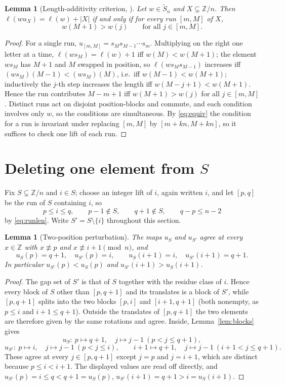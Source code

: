 \documentclass[11pt]{article}
\newtheorem{lem}[thm]{Lemma}
\theoremstyle{definition}
\newcommand{\Z}{\mathbb{Z}}
\newcommand{\Saff}{\widetilde{S}_{n}}
\begin{document}
\begin{lem}[Length-additivity criterion, {\cite[Lem.~2.3]{Clio2}}]\label{lem:add}
Let $w\in\Saff$ and $X\subsetneq\Z/n$. Then $\ell(wu_X)=\ell(w)+|X|$ if and only if for every
run $[m,M]$ of $X$,
\[
  w(M+1)>w(j)\qquad\text{for all }j\in[m,M].
\]
\end{lem}

\begin{proof}
For a single run, $u_{[m,M]}=s_Ms_{M-1}\cdots s_m$. Multiplying on the right one letter at a
time, $\ell(ws_M)=\ell(w)+1$ iff $w(M)<w(M+1)$; the element $ws_M$ has $M+1$ and $M$ swapped in
position, so $\ell(ws_Ms_{M-1})$ increases iff $(ws_M)(M-1)<(ws_M)(M)$, i.e.\ iff
$w(M-1)<w(M+1)$; inductively the $j$-th step increases the length iff $w(M-j+1)<w(M+1)$. Hence
the run contributes $M-m+1$ iff $w(M+1)>w(j)$ for all $j\in[m,M]$. Distinct runs act on
disjoint position-blocks and commute, and each condition involves only $w$, so the conditions
are simultaneous. By \eqref{eq:equiv} the condition for a run is invariant under replacing
$[m,M]$ by $[m+kn,M+kn]$, so it suffices to check one lift of each run.
\end{proof}

\section{Deleting one element from \texorpdfstring{$S$}{S}}\label{sec:delete}

Fix $S\subsetneq\Z/n$ and $i\in S$; choose an integer lift of $i$, again written $i$, and let
$[p,q]$ be the run of $S$ containing $i$, so
\begin{equation}\label{eq:pq}
  p\le i\le q,\qquad p-1\notin S,\qquad q+1\notin S,\qquad q-p\le n-2
\end{equation}
by \eqref{eq:runlen}. Write $S'=S\setminus\{i\}$ throughout this section.

\begin{lem}[Two-position perturbation]\label{lem:perturb}
The maps $u_S$ and $u_{S'}$ agree at every $x\in\Z$ with $x\not\equiv p$ and
$x\not\equiv i+1\pmod n$, and
\[
  u_S(p)=q+1,\quad u_{S'}(p)=i,\qquad u_S(i+1)=i,\quad u_{S'}(i+1)=q+1 .
\]
In particular $u_{S'}(p)<u_S(p)$ and $u_{S'}(i+1)>u_S(i+1)$.
\end{lem}

\begin{proof}
The gap set of $S'$ is that of $S$ together with the residue class of $i$. Hence every block of
$S$ other than $[p,q+1]$ and its translates is a block of $S'$, while $[p,q+1]$ splits into the
two blocks $[p,i]$ and $[i+1,q+1]$ (both nonempty, as $p\le i$ and $i+1\le q+1$). Outside the
translates of $[p,q+1]$ the two elements are therefore given by the same rotations and agree.
Inside, Lemma~\ref{lem:blocks} gives
\[
  u_S:\ p\mapsto q+1,\quad j\mapsto j-1\ (p<j\le q+1),
\]
\[
  u_{S'}:\ p\mapsto i,\quad j\mapsto j-1\ (p<j\le i),\qquad
           i+1\mapsto q+1,\quad j\mapsto j-1\ (i+1<j\le q+1).
\]
These agree at every $j\in[p,q+1]$ except $j=p$ and $j=i+1$, which are distinct because
$p\le i<i+1$. The displayed values are read off directly, and
$u_{S'}(p)=i\le q<q+1=u_S(p)$, $u_{S'}(i+1)=q+1>i=u_S(i+1)$.
\end{proof}
\end{document}
